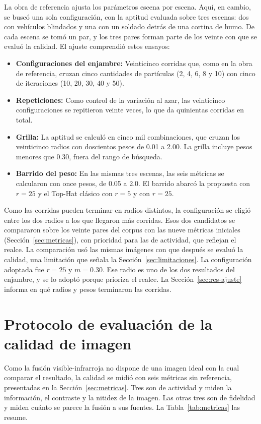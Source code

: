 La obra de referencia ajusta los parámetros escena por escena. Aquí, en cambio, se buscó una sola
configuración, con la aptitud evaluada sobre tres escenas: dos con vehículos blindados y una con un
soldado detrás de una cortina de humo. De cada escena se tomó un par, y los tres pares forman parte de
los veinte con que se evaluó la calidad. El ajuste comprendió estos ensayos:
\begin{itemize}
\item \textbf{Configuraciones del enjambre:} Veinticinco corridas que, como en la obra de referencia,
cruzan cinco cantidades de partículas (2, 4, 6, 8 y 10) con cinco de iteraciones (10, 20, 30, 40 y 50).
\item \textbf{Repeticiones:} Como control de la variación al azar, las veinticinco configuraciones se
repitieron veinte veces, lo que da quinientas corridas en total.
\item \textbf{Grilla:} La aptitud se calculó en cinco mil combinaciones, que cruzan los veinticinco
radios con doscientos pesos de 0.01 a 2.00. La grilla incluye pesos menores que 0.30, fuera del rango
de búsqueda.
\item \textbf{Barrido del peso:} En las mismas tres escenas, las seis métricas se calcularon con once
pesos, de 0.05 a 2.0. El barrido abarcó la propuesta con $r = 25$ y el Top-Hat clásico con $r = 5$ y
con $r = 25$.
\end{itemize}

Como las corridas pueden terminar en radios distintos, la configuración se eligió entre los dos radios
a los que llegaron más corridas. Esos dos candidatos se compararon sobre los veinte pares del corpus
con las nueve métricas iniciales (Sección~\ref{sec:metricas}), con prioridad para las de
actividad, que reflejan el realce. La comparación usó las mismas imágenes con que después se evaluó la
calidad, una limitación que señala la Sección~\ref{sec:limitaciones}. La configuración adoptada fue
$r = 25$ y $m = 0.30$. Ese radio es uno de los dos resultados del enjambre, y se lo adoptó porque
prioriza el realce. La Sección~\ref{sec:res-ajuste} informa en qué radios y pesos terminaron las
corridas.

\section{Protocolo de evaluación de la calidad de imagen}
\label{sec:protocolo-calidad}

Como la fusión visible-infrarroja no dispone de una imagen ideal con la cual comparar el resultado, la
calidad se midió con seis métricas sin referencia, presentadas en la Sección~\ref{sec:metricas}. Tres
son de actividad y miden la información, el contraste y la nitidez de la imagen. Las otras tres son de
fidelidad y miden cuánto se parece la fusión a sus fuentes. La Tabla~\ref{tab:metricas} las resume.

